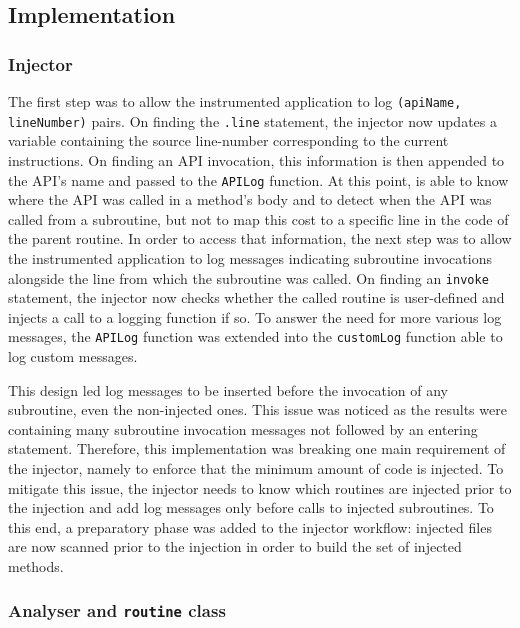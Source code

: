 \subsection{Implementation}

\subsubsection{Injector}

The first step was to allow the instrumented application to log 
\texttt{(apiName, lineNumber)} pairs. On finding the \smali{} 
\texttt{.line} statement, the injector now updates a variable containing 
the source line-number corresponding to the current instructions. On 
finding an API invocation, this information is then appended to the 
API's name and passed to the \texttt{APILog} function. At this point, 
\Orka{} is able to know where the API was called in a method's body and 
to detect when the API was called from a subroutine, but not to map this 
cost to a specific line in the code of the parent routine. In order to 
access that information, the next step was to allow the instrumented 
application to log messages indicating subroutine invocations alongside 
the line from which the subroutine was called. On finding an 
\texttt{invoke} statement, the injector now checks whether the called 
routine is user-defined and injects a call to a logging function if so. 
To answer the need for more various log messages, the \texttt{APILog} 
function was extended into the \texttt{customLog} function able to log 
custom messages.

This design led log messages to be inserted before the invocation of any 
subroutine, even the non-injected ones. This issue was noticed as the 
\logcat{} results were containing many subroutine invocation messages 
not followed by an entering statement. Therefore, this implementation 
was breaking one main requirement of the injector, namely to enforce 
that the minimum amount of code is injected. To mitigate this issue, the 
injector needs to know which routines are injected prior to the 
injection and add log messages only before calls to injected 
subroutines. To this end, a preparatory phase was added to the injector 
workflow: injected files are now scanned prior to the injection in order 
to build the set of injected methods.

\subsubsection{Analyser and \texttt{routine} class}

